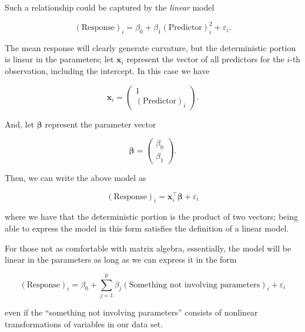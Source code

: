 \documentclass[
  letterpaper,
  DIV=11,
  numbers=noendperiod]{scrreprt}
\theoremstyle{definition}
\theoremstyle{definition}
\theoremstyle{remark}
\begin{document}
Such a relationship could be captured by the \emph{linear} model

\[(\text{Response})_i = \beta_0 + \beta_1 (\text{Predictor})_i^2 + \varepsilon_i.\]

The mean response will clearly generate curvature, but the deterministic
portion is linear in the parameters; let \(\mathbf{x}_i\) represent the
vector of all predictors for the \(i\)-th observation, including the
intercept. In this case we have

\[\mathbf{x}_i = \begin{pmatrix} 1 \\ (\text{Predictor})_i \end{pmatrix}.\]

And, let \(\boldsymbol{\beta}\) represent the parameter vector

\[\boldsymbol{\beta} = \begin{pmatrix} \beta_0 \\ \beta_1 \end{pmatrix}.\]

Then, we can write the above model as

\[(\text{Response})_i = \mathbf{x}_i^\top \boldsymbol{\beta} + \varepsilon_i\]

where we have that the deterministic portion is the product of two
vectors; being able to express the model in this form satisfies the
definition of a linear model.

\begin{tcolorbox}[enhanced jigsaw, bottomrule=.15mm, titlerule=0mm, bottomtitle=1mm, colback=white, coltitle=black, rightrule=.15mm, leftrule=.75mm, toprule=.15mm, toptitle=1mm, left=2mm, opacityback=0, colframe=quarto-callout-note-color-frame, breakable, title=\textcolor{quarto-callout-note-color}{\faInfo}\hspace{0.5em}{Note}, arc=.35mm, colbacktitle=quarto-callout-note-color!10!white, opacitybacktitle=0.6]

For those not as comfortable with matrix algebra, essentially, the model
will be linear in the parameters as long as we can express it in the
form

\[(\text{Response})_i = \beta_0 + \sum_{j=1}^{p} \beta_j (\text{Something not involving parameters})_i + \varepsilon_i\]

even if the ``something not involving parameters'' consists of nonlinear
transformations of variables in our data set.

\end{tcolorbox}
\end{document}
